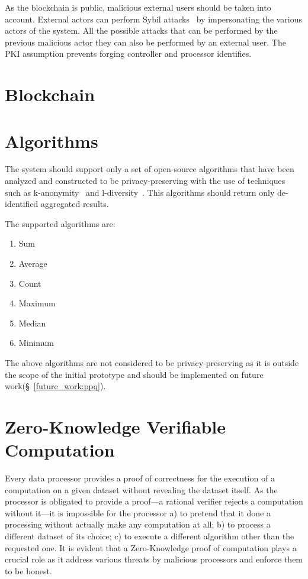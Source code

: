 As the blockchain is public, malicious external users should be taken into account. External actors can perform Sybil attacks~\cite{sybil_attack} by impersonating the various actors of the system. All the possible attacks that can be performed by the previous malicious actor they can also be performed by an external user. The PKI assumption prevents forging controller and processor identifies.

\section{Blockchain}
\label{solution:blockchain}

\section{Algorithms}
\label{solution:algorithms}

The system should support only a set of open-source algorithms that have been analyzed and constructed to be privacy-preserving with the use of techniques such as k-anonymity~\cite{Samarati98protectingprivacy} and l-diversity~\cite{Aggarwal2008}. This algorithms should return only de-identified aggregated results.

The supported algorithms are:

\begin{enumerate}
  \item Sum
  \item Average
  \item Count
  \item Maximum
  \item Median
  \item Minimum
\end{enumerate}

The above algorithms are not considered to be privacy-preserving as it is outside the scope of the initial prototype and should be implemented on future work(§~\ref{future_work:ppq}).

\section{Zero-Knowledge Verifiable Computation}
\label{solution:proof}

Every data processor provides a proof of correctness for the execution of a computation on a given dataset without revealing the dataset itself. As the processor is obligated to provide a proof---a rational verifier rejects a computation without it---it is impossible for the processor a) to pretend that it done a processing without actually make any computation at all; b) to process a different dataset of its choice; c) to execute a different algorithm other than the requested one. It is evident that a Zero-Knowledge proof of computation plays a crucial role as it address various threats by malicious processors and enforce them to be honest.

